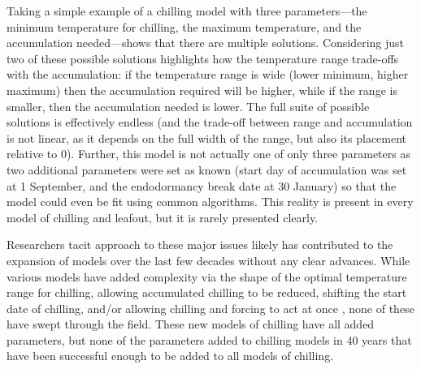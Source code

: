 \documentclass[11pt]{article}
\begin{document}
Taking a simple example of a chilling model with three parameters---the minimum temperature for chilling, the maximum temperature, and the accumulation needed---shows that there are multiple solutions. Considering just two of these possible solutions highlights how the temperature range trade-offs with the accumulation: if the temperature range is wide (lower minimum, higher maximum) then the accumulation required will be higher, while if the range is smaller, then the accumulation needed is lower. The full suite of possible solutions is effectively endless (and the trade-off between range and accumulation is not linear, as it depends on the full width of the range, but also its placement relative to 0). Further, this model is not actually one of only three parameters as two additional parameters were set as known (start day of accumulation was set at 1 September, and the endodormancy break date at 30 January) so that the model could even be fit using common algorithms. %
This reality is present in every model of chilling and leafout, but it is rarely presented clearly. %

Researchers tacit approach to these major issues likely has contributed to the expansion of models over the last few decades without any clear advances. While various models have added complexity via the shape of the optimal temperature range for chilling, allowing accumulated chilling to be reduced, shifting the start date of chilling, and/or allowing chilling and forcing to act at once \citep{lued2009,gusewell2017,hanninen1990modelling,Kramer1994}, none of these have swept through the field. These new models of chilling have all added parameters, but none of the parameters added to chilling models in 40 years that have been successful enough to be added to all models of chilling. 
\end{document}
